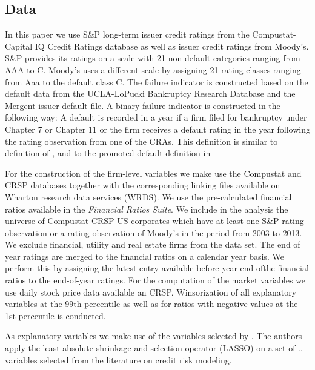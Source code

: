 \documentclass{article}
\begin{document}
\subsection{Data}
In this paper we use S\&P long-term issuer credit ratings from the Compustat-Capital IQ Credit Ratings database as well as issuer credit ratings from Moody's. S\&P provides its ratings on a scale with 21
non-default categories ranging from AAA to C. Moody’s uses a different scale by assigning 21 rating classes ranging from Aaa to the default class C. The failure indicator is constructed based on the default data from the
UCLA-LoPucki Bankruptcy Research Database and the Mergent issuer default file. A binary
failure indicator is constructed in the following way: A default is recorded in a year if a firm filed for bankruptcy under Chapter 7 or Chapter 11 or the firm receives a default rating in the year following the rating observation from
one of the CRAs. This definition is similar to definition of \cite{campbell2008search}, and to the promoted
default definition in \cite{baselii}


For the construction of the firm-level variables we make use the Compustat
and CRSP databases together with the corresponding linking files available on Wharton research data services (WRDS). We use the pre-calculated financial
ratios available in the \textit{Financial Ratios Suite}.
We include in the analysis the universe of Compustat \/CRSP US
corporates which have at least one S\&P rating observation or a rating observation of Moody's in the period from
2003 to 2013. We exclude financial, utility and real estate firms from the data set. The end of year
ratings are merged to the financial ratios on a
calendar year basis. We perform this by assigning the
latest entry available before year end ofthe financial ratios to the end-of-year ratings.  For the computation of the market variables we use daily stock
price data available an CRSP. Winsorization of all explanatory variables at the 99th percentile as well as
for ratios with negative values at the 1st percentile is conducted.

As explanatory variables we make use of the variables selected by \cite{Tian2015}. The authors apply the least absolute shrinkage and selection operator (LASSO) on a set of .. variables selected from the literature on credit risk modeling.
\end{document}
